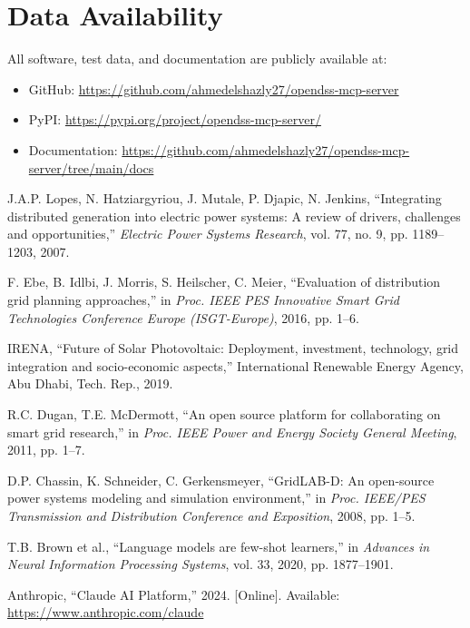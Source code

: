 \documentclass[review]{elsarticle}
\begin{document}
\section*{Data Availability}

All software, test data, and documentation are publicly available at:
\begin{itemize}
    \item GitHub: \url{https://github.com/ahmedelshazly27/opendss-mcp-server}
    \item PyPI: \url{https://pypi.org/project/opendss-mcp-server/}
    \item Documentation: \url{https://github.com/ahmedelshazly27/opendss-mcp-server/tree/main/docs}
\end{itemize}

\begin{thebibliography}{99}

J.A.P. Lopes, N. Hatziargyriou, J. Mutale, P. Djapic, N. Jenkins,
``Integrating distributed generation into electric power systems: A review of drivers, challenges and opportunities,''
\textit{Electric Power Systems Research}, vol. 77, no. 9, pp. 1189--1203, 2007.

F. Ebe, B. Idlbi, J. Morris, S. Heilscher, C. Meier,
``Evaluation of distribution grid planning approaches,''
in \textit{Proc. IEEE PES Innovative Smart Grid Technologies Conference Europe (ISGT-Europe)}, 2016, pp. 1--6.

IRENA,
``Future of Solar Photovoltaic: Deployment, investment, technology, grid integration and socio-economic aspects,''
International Renewable Energy Agency, Abu Dhabi, Tech. Rep., 2019.

R.C. Dugan, T.E. McDermott,
``An open source platform for collaborating on smart grid research,''
in \textit{Proc. IEEE Power and Energy Society General Meeting}, 2011, pp. 1--7.

D.P. Chassin, K. Schneider, C. Gerkensmeyer,
``GridLAB-D: An open-source power systems modeling and simulation environment,''
in \textit{Proc. IEEE/PES Transmission and Distribution Conference and Exposition}, 2008, pp. 1--5.

T.B. Brown et al.,
``Language models are few-shot learners,''
in \textit{Advances in Neural Information Processing Systems}, vol. 33, 2020, pp. 1877--1901.

Anthropic,
``Claude AI Platform,'' 2024. [Online].
Available: \url{https://www.anthropic.com/claude}


\end{thebibliography}
\end{document}
